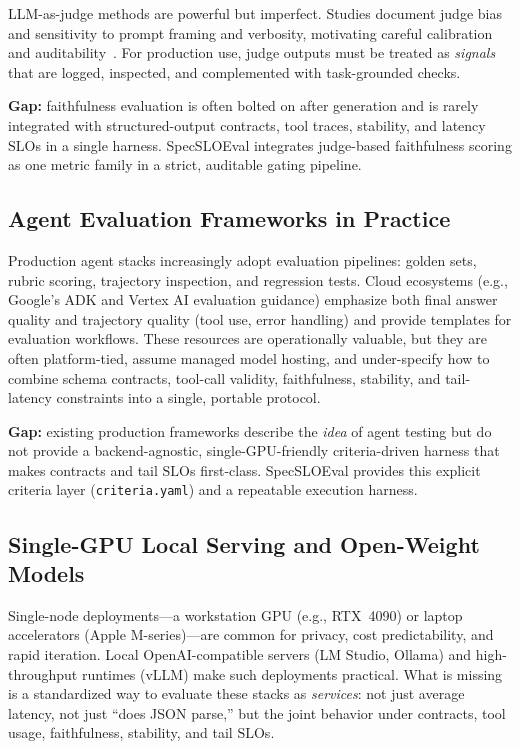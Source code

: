\documentclass[11pt]{article}
\newcommand{\slo}{\ensuremath{\mathrm{SLO}}}
\begin{document}
LLM-as-judge methods are powerful but imperfect.
Studies document judge bias and sensitivity to prompt framing and verbosity, motivating careful calibration and auditability~\citep{chen2024humans}.
For production use, judge outputs must be treated as \emph{signals} that are logged, inspected, and complemented with task-grounded checks.

\textbf{Gap:} faithfulness evaluation is often bolted on after generation and is rarely integrated with structured-output contracts, tool traces, stability, and latency \slo s in a single harness.
SpecSLOEval integrates judge-based faithfulness scoring as one metric family in a strict, auditable gating pipeline.

\subsection{Agent Evaluation Frameworks in Practice}

Production agent stacks increasingly adopt evaluation pipelines: golden sets, rubric scoring, trajectory inspection, and regression tests.
Cloud ecosystems (e.g., Google’s ADK and Vertex AI evaluation guidance) emphasize both final answer quality and trajectory quality (tool use, error handling) and provide templates for evaluation workflows.
These resources are operationally valuable, but they are often platform-tied, assume managed model hosting, and under-specify how to combine schema contracts, tool-call validity, faithfulness, stability, and tail-latency constraints into a single, portable protocol.

\textbf{Gap:} existing production frameworks describe the \emph{idea} of agent testing but do not provide a backend-agnostic, single-GPU-friendly criteria-driven harness that makes contracts and tail \slo s first-class.
SpecSLOEval provides this explicit criteria layer (\texttt{criteria.yaml}) and a repeatable execution harness.

\subsection{Single-GPU Local Serving and Open-Weight Models}

Single-node deployments---a workstation GPU (e.g., RTX~4090) or laptop accelerators (Apple M-series)---are common for privacy, cost predictability, and rapid iteration.
Local OpenAI-compatible servers (LM Studio, Ollama) and high-throughput runtimes (vLLM) make such deployments practical.
What is missing is a standardized way to evaluate these stacks as \emph{services}: not just average latency, not just “does JSON parse,” but the joint behavior under contracts, tool usage, faithfulness, stability, and tail \slo s.
\end{document}
